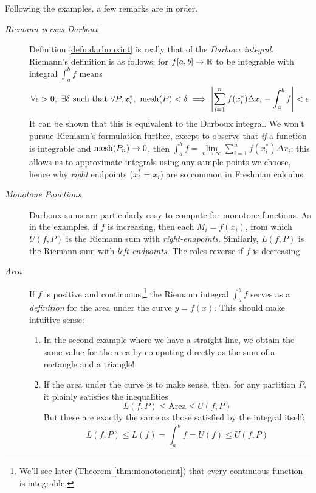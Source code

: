 \label{pg:riemanndefthm}
Following the examples, a few remarks are in order.
\begin{description}
  \item[\normalfont\emph{Riemann versus Darboux} ] Definition \ref{defn:darbouxint} is really that of the \emph{Darboux integral.} Riemann's definition is as follows: for $f[a,b]\to\mathbb{R}$ to be integrable with integral $\int_a^bf$ means
	\begin{gather*}
	\forall\epsilon>0,\ \exists\delta\text{ such that }\forall P,x_i^*,\ \operatorname{mesh}(P)<\delta\implies \left| \sum\limits_{i=1}^nf(x_i^*)\Delta x_i-\int_a^bf\right|<\epsilon
	\end{gather*}
	It can be shown that this is equivalent to the Darboux integral. We won't pursue Riemann's formulation further, except to observe that \emph{if} a function is integrable and $\operatorname{mesh}(P_n)\to 0$, then $\int_a^b f=\lim\limits_{n\to\infty}\sum\limits_{i=1}^nf(x_i^*)\Delta x_i$: this allows us to approximate integrals using any sample points we choose, hence why \emph{right} endpoints ($x_i^*=x_i$) are so common in Freshman calculus.
  \item[\normalfont\emph{Monotone Functions} ] Darboux sums are particularly easy to compute for monotone functions. As in the examples, if $f$ is increasing, then each $M_i=f(x_i)$, from which $U(f,P)$ is the Riemann sum with \emph{right-endpoints.} Similarly, $L(f,P)$ is the Riemann sum with \emph{left-endpoints.} The roles reverse if $f$ is decreasing.
  \item[\normalfont\emph{Area} ] If $f$ is positive and continuous,\footnote{We'll see later (Theorem \ref{thm:monotoneint}) that every continuous function is integrable.} the Riemann integral $\int_a^bf$ serves as a \emph{definition} for the area under the curve $y=f(x)$. This should make intuitive sense:
  \begin{enumerate}
    \item In the second example where we have a straight line, we obtain the same value for the area by computing directly as the sum of a rectangle and a triangle!
    \item If the area under the curve is to make sense, then, for any partition $P$, it plainly satisfies the inequalities
  	\[L(f,P)\le \text{Area}\le U(f,P)\]
  	But these are exactly the same as those satisfied by the integral itself:
  	\[L(f,P)\le L(f)=\int_a^bf=U(f)\le U(f,P)\]
  \end{enumerate}
\end{description}


